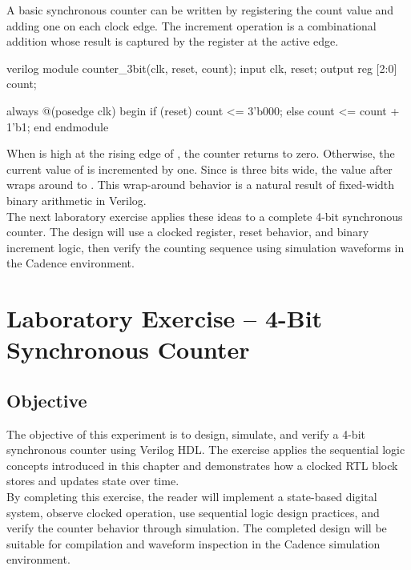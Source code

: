 \noindent A basic synchronous counter can be written by registering the count value and adding one
on each clock edge. The increment operation is a combinational addition whose result is captured by
the register at the active edge.

\begin{codeblock}{verilog}
module counter_3bit(clk, reset, count);
    input clk, reset;
    output reg [2:0] count;

    always @(posedge clk) begin
        if (reset)
            count <= 3'b000;
        else
            count <= count + 1'b1;
    end
endmodule
\end{codeblock}

\noindent When  is high at the rising edge of , the counter
returns to zero. Otherwise, the current value of  is incremented by one. Since
 is three bits wide, the value after  wraps around to
. This wrap-around behavior is a natural result of fixed-width binary arithmetic in
Verilog.\\

\noindent The next laboratory exercise applies these ideas to a complete 4-bit synchronous counter.
The design will use a clocked register, reset behavior, and binary increment logic, then verify the
counting sequence using simulation waveforms in the Cadence environment.

\section{Laboratory Exercise -- 4-Bit Synchronous Counter}

\subsection{Objective}
The objective of this experiment is to design, simulate, and verify a 4-bit synchronous counter
using Verilog HDL. The exercise applies the sequential logic concepts introduced in this chapter and
demonstrates how a clocked RTL block stores and updates state over time.\\

\noindent By completing this exercise, the reader will implement a state-based digital system,
observe clocked operation, use sequential logic design practices, and verify the counter behavior
through simulation. The completed design will be suitable for compilation and waveform inspection in
the Cadence simulation environment.

